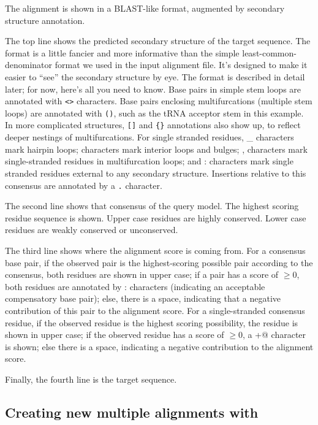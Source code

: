 The alignment is shown in a BLAST-like format, augmented by secondary
structure annotation. 

The top line shows the predicted secondary structure of the target
sequence. The format is a little fancier and more informative than the
simple least-common-denominator format we used in the input alignment
file. It's designed to make it easier to ``see'' the secondary
structure by eye. The format is described in detail later; for now,
here's all you need to know. Base pairs in simple stem loops are
annotated with \verb+<>+ characters. Base pairs enclosing
multifurcations (multiple stem loops) are annotated with \verb+()+,
such as the tRNA acceptor stem in this example. In more complicated
structures, \verb+[]+ and \verb+{}+ annotations also show up, to
reflect deeper nestings of multifurcations. For single stranded
residues, \_ characters mark hairpin loops; \- characters mark
interior loops and bulges; , characters mark single-stranded residues
in multifurcation loops; and : characters mark single stranded
residues external to any secondary structure. Insertions relative to
this consensus are annotated by a \verb+.+ character.

The second line shows that consensus of the query model. The highest
scoring residue sequence is shown. Upper case residues are highly
conserved. Lower case residues are weakly conserved or unconserved.

The third line shows where the alignment score is coming from. For a
consensus base pair, if the observed pair is the highest-scoring
possible pair according to the consensus, both residues are shown in
upper case; if a pair has a score of $\geq 0$, both residues are
annotated by : characters (indicating an acceptable compensatory base
pair); else, there is a space, indicating that a negative contribution
of this pair to the alignment score. For a single-stranded consensus
residue, if the observed residue is the highest scoring possibility,
the residue is shown in upper case; if the observed residue has a
score of $\geq 0$, a \verb@+@ character is shown; else there is a
space, indicating a negative contribution to the alignment score.

Finally, the fourth line is the target sequence.

\subsection{Creating new multiple alignments with }

